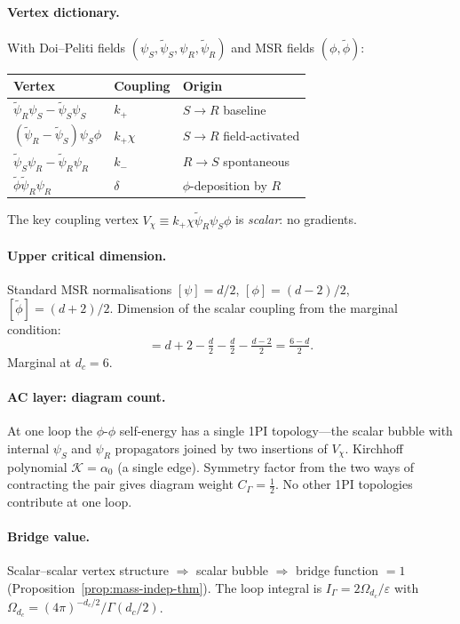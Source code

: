 \documentclass[10pt,a4paper,twocolumn]{article}
\newcommand{\phit}{\tilde\phi}
\newcommand{\psit}{\tilde\psi}
\newcommand{\KK}{\mathcal{K}}
\theoremstyle{definition}
\begin{document}
\paragraph{Vertex dictionary.}
With Doi--Peliti fields $(\psi_S, \psit_S, \psi_R, \psit_R)$ and
MSR fields $(\phi, \phit)$:
\begin{center}
\small
\begin{tabular}{@{}lll@{}}
\toprule
Vertex & Coupling & Origin \\
\midrule
$\psit_R\psi_S - \psit_S\psi_S$ & $k_+$ & $S\to R$ baseline \\
$(\psit_R - \psit_S)\psi_S\phi$ & $k_+\chi$ & $S\to R$ field-activated \\
$\psit_S\psi_R - \psit_R\psi_R$ & $k_-$ & $R\to S$ spontaneous \\
$\phit\psit_R\psi_R$ & $\delta$ & $\phi$-deposition by $R$ \\
\bottomrule
\end{tabular}
\end{center}
The key coupling vertex $V_\chi \equiv k_+\chi\psit_R\psi_S\phi$
is \emph{scalar}: no gradients.

\paragraph{Upper critical dimension.}
Standard MSR normalisations $[\psi] = d/2$,
$[\phi] = (d{-}2)/2$, $[\phit] = (d{+}2)/2$.  Dimension of the
scalar coupling from the marginal condition:
\begin{equation}
  [k_+\chi] = d + 2 - \tfrac{d}{2} - \tfrac{d}{2} -
    \tfrac{d{-}2}{2} = \tfrac{6-d}{2}.
\end{equation}
Marginal at $d_c = 6$.

\paragraph{AC layer: diagram count.}
At one loop the $\phi$-$\phi$ self-energy has a single 1PI
topology---the scalar bubble with internal $\psi_S$ and $\psi_R$
propagators joined by two insertions of $V_\chi$.  Kirchhoff
polynomial $\KK = \alpha_0$ (a single edge).  Symmetry factor
from the two ways of contracting the pair gives diagram weight
$C_\Gamma = \tfrac{1}{2}$.  No other 1PI topologies contribute
at one loop.

\paragraph{Bridge value.}
Scalar--scalar vertex structure $\Rightarrow$ scalar bubble
$\Rightarrow$ bridge function $= 1$
(Proposition~\ref{prop:mass-indep-thm}).  The loop integral is
$I_\Gamma = 2\Omega_{d_c}/\varepsilon$ with
$\Omega_{d_c} = (4\pi)^{-d_c/2}/\Gamma(d_c/2)$.
\end{document}
